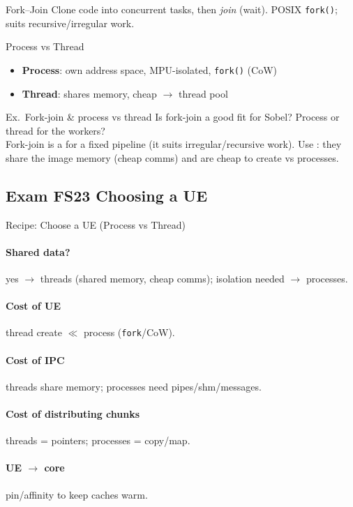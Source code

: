 
\begin{definition}{Fork--Join}
    Clone code into concurrent tasks, then \emph{join} (wait).  POSIX \texttt{fork()}; suits recursive/irregular work.
\end{definition}

\begin{definition}{Process vs Thread}
    \begin{itemize}
        \item \textbf{Process}: own address space, MPU-isolated, \texttt{fork()} (CoW)
        \item \textbf{Thread}: shares memory, cheap $\to$ thread pool
    \end{itemize}
\end{definition}

\multend

\begin{example2}{Ex.\ Fork-join \& process vs thread}
    Is fork-join a good fit for Sobel? Process or thread for the workers?
     \\ 
    Fork-join is a  for a fixed pipeline (it suits irregular/recursive work). Use : they share the image memory (cheap comms) and are cheap to create vs processes.
\end{example2}

\subsection{Exam FS23 Choosing a UE}

\begin{KR}{Recipe: Choose a UE (Process vs Thread)}
    \paragraph{Shared data?} yes $\to$ threads (shared memory, cheap comms); isolation needed $\to$ processes.
    \paragraph{Cost of UE} thread create $\ll$ process (\texttt{fork}/CoW).
    \paragraph{Cost of IPC} threads share memory; processes need pipes/shm/messages.
    \paragraph{Cost of distributing chunks} threads = pointers; processes = copy/map.
    \paragraph{UE $\to$ core} pin/affinity to keep caches warm.
\end{KR}

